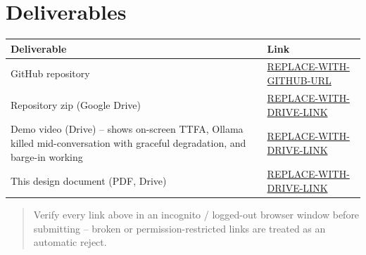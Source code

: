 \documentclass[11pt]{article}
\begin{document}
\section{Deliverables}

\begin{center}
\begin{tabular}{@{}p{4.2cm}p{9.3cm}@{}}
\toprule
\textbf{Deliverable} & \textbf{Link} \\
\midrule
GitHub repository & \url{REPLACE-WITH-GITHUB-URL} \\
Repository zip (Google Drive) & \url{REPLACE-WITH-DRIVE-LINK} \\
Demo video (Drive) -- shows on-screen TTFA, Ollama killed mid-conversation with graceful
degradation, and barge-in working & \url{REPLACE-WITH-DRIVE-LINK} \\
This design document (PDF, Drive) & \url{REPLACE-WITH-DRIVE-LINK} \\
\bottomrule
\end{tabular}
\end{center}

\begin{quote}\small\color{red!70!black}
Verify every link above in an incognito / logged-out browser window before submitting --
broken or permission-restricted links are treated as an automatic reject.
\end{quote}
\end{document}
